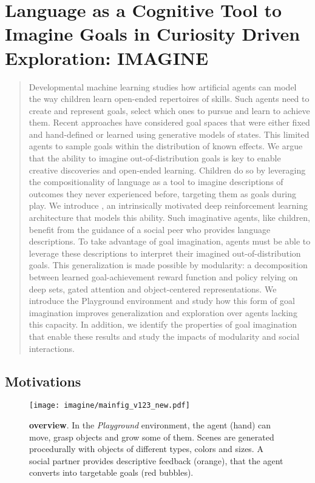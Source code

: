 \chapter{Language as a Cognitive Tool to Imagine Goals in Curiosity Driven Exploration: IMAGINE}

\minitoc

\begin{abstract}
Developmental machine learning studies how artificial agents can model the way children learn open-ended repertoires of skills. Such agents need to create and represent goals, select which ones to pursue and learn to achieve them. Recent approaches have considered goal spaces that were either fixed and hand-defined or learned using generative models of states. This limited agents to sample goals within the distribution of known effects. We argue that the ability to imagine out-of-distribution goals is key to enable creative discoveries and open-ended learning. Children do so by leveraging the compositionality of language as a tool to imagine descriptions of outcomes they never experienced before, targeting them as goals during play. We introduce \imagine, an intrinsically motivated deep reinforcement learning architecture that models this ability. Such imaginative agents, like children, benefit from the guidance of a social peer who provides language descriptions. To take advantage of goal imagination, agents must be able to leverage these descriptions to interpret their imagined out-of-distribution goals. This generalization is made possible by modularity: a decomposition between learned goal-achievement reward function and policy relying on deep sets, gated attention and object-centered representations. We introduce the Playground environment and study how this form of goal imagination improves generalization and exploration over agents lacking this capacity. In addition, we identify the properties of goal imagination that enable these results and study the impacts of modularity and social interactions.
\end{abstract}

\section{Motivations}

\begin{figure}[ht!]
  \centering
    \texttt{[image: imagine/mainfig\_v123\_new.pdf]}
  \caption{\textbf{\imagine overview}. In the \textit{Playground} environment, the agent (hand) can move, grasp objects and grow some of them.
  Scenes are generated procedurally with objects of different types, colors and sizes. A social partner provides descriptive feedback (orange), that the agent converts into targetable goals (red bubbles). \label{fig:main}
}
  \vspace{-.5cm}
\end{figure} 


